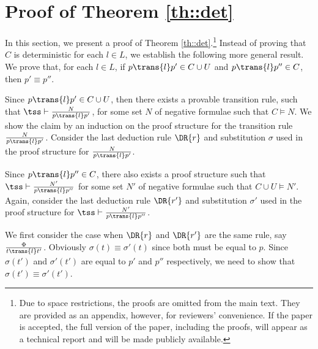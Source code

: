 \newpage
\section{Proof of Theorem \ref{th::det}}
\label{proof::det}

In this section, we present a proof of Theorem \ref{th::det}.\footnote{Due to space restrictions, the proofs are omitted from the main text. They are provided as an appendix, however, for reviewers' convenience. If the paper is accepted, the full version of the paper, including the proofs, will appear as a technical report and will be made publicly available.}
Instead of proving that $C$ is deterministic for each $l \in L$, we establish the following more general result.
We prove that, for each $l \in L$, if $p \trans{l} p' \in C \cup U$ and $p \trans{l} p'' \in C$, then $p' \equiv p''$.

Since $p \trans{l} p' \in C \cup U$, then there exists a provable transition rule, such that
$\tss \vdash \frac{N}{p \trans{l} p'}$, for some set $N$ of negative formulae such that $C \vDash N$.
We show the claim by an induction on the proof structure
for the transition rule $\frac{N}{p \trans{l} p'}$.
Consider the last deduction rule $\DR{r}$ and substitution $\sigma$
used in the proof structure for $\frac{N}{p \trans{l} p'}$.


Since $p \trans{l} p'' \in C$,
there also exists a proof structure such that $\tss \vdash \frac{N'}{p \trans{l} p''}$
for some set $N'$ of negative formulae such that $C \cup U \vDash N'$.
Again, consider the last deduction rule $\DR{r'}$ and substitution $\sigma'$ used in the proof structure for $\tss \vdash \frac{N'}{p \trans{l} p''}$.

We first consider the case when $\DR{r}$ and $\DR{r'}$ are the same rule, say $\frac{\Phi}{t\trans{l}t'}$.
Obviously $\sigma(t)\equiv\sigma'(t)$ since both must be equal to $p$.
Since $\sigma(t')$ and $\sigma'(t')$ are equal to $p'$ and $p''$ respectively, we need to
show that $\sigma(t') \equiv \sigma'(t')$.


